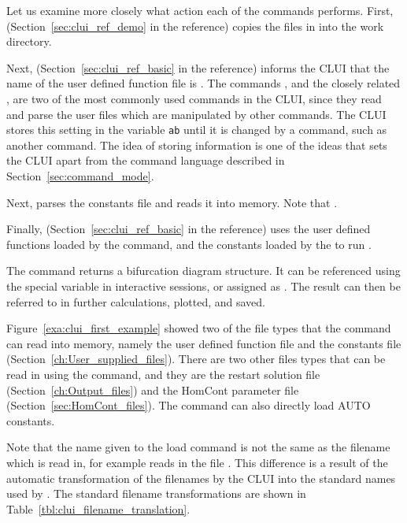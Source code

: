 \documentclass[12pt]{report}
\begin{document}
 Let us examine more closely what action each of the commands 
 performs.  First,  
 (Section~\ref{sec:clui_ref_demo} in the reference) copies the files in 
  into the work directory.  

 Next,  
 (Section~\ref{sec:clui_ref_basic} in the reference)
 informs the \AUTO CLUI that the name of
 the user defined function file is .  The commands
 , and the closely related , are
 two of the most commonly used commands in the
 \AUTO CLUI, since they read and parse the user files which are
 manipulated by other commands.  The \AUTO CLUI stores this setting in
 the variable {\tt ab} until it is changed by a command,
 such as another 
 command.  The idea of storing information is one of the ideas that
 sets the CLUI apart from the command language described in
 Section~\ref{sec:command_mode}.

 Next,  parses the \AUTO
 constants file  and reads it into memory.  Note that
 .  

 Finally,  
 (Section~\ref{sec:clui_ref_basic} in the reference)
 uses the user defined functions loaded
 by the  command, and the \AUTO constants
 loaded by the  to run \AUTO.

 The  command returns a bifurcation diagram structure. It can
 be referenced using the special \commandf{\_} variable in interactive
 sessions, or assigned as . The result
 can then be referred to in further calculations, plotted, and saved.

 Figure~\ref{exa:clui_first_example} showed two of 
 the file types that the 
  command can read into memory, namely 
 the user defined function file and the \AUTO constants
 file (Section~\ref{ch:User_supplied_files}).  
 There are two other files types that can be read
 in using the  command, and they are
 the restart solution file (Section~\ref{ch:Output_files})
 and the {\cal HomCont} parameter
 file (Section~\ref{sec:HomCont_files}). The  command
 can also directly load AUTO constants.

 Note that the name given to the load
 command is not the same as the filename which is read
 in, for example  reads in 
 the file .  This difference is 
 a result of the automatic transformation of the
 filenames by the 
 \AUTO CLUI into the
 standard names used by \AUTO.  
 The standard filename
 transformations are shown in Table~\ref{tbl:clui_filename_translation}. 
\end{document}
